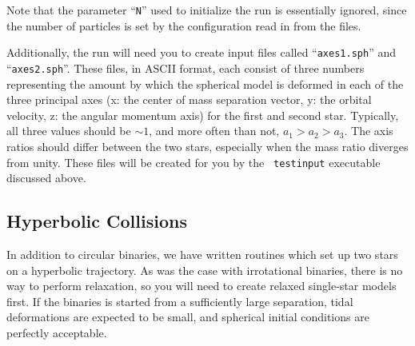 Note that the parameter ``{\tt N}'' used to initialize the run is
essentially ignored, since the number of particles is set by the
configuration read in from the files.

Additionally, the run will need you to create input files called
``{\tt axes1.sph}'' and ``{\tt axes2.sph}''.  These files, in ASCII
format, each consist of three
numbers representing the amount by which the spherical model is
deformed in each of the three principal axes (x: the center of mass
separation vector, y: the orbital velocity, z: the angular momentum
axis) for the first and second star.
Typically, all three values should be $\sim 1$, and more often than
not, $a_1>a_2>a_3$.  The axis ratios should differ between the two
stars, especially when the mass ratio diverges from unity.
These files will be created for you by the {\tt
testinput} executable discussed above.

\subsection{Hyperbolic Collisions}
\label{in:hy}
In addition to circular binaries, we have written routines which set
up two stars on a hyperbolic trajectory.  As was the case with
irrotational binaries, there is no way to perform relaxation, so you
will need to create relaxed single-star models first.  If the binaries
is started from a sufficiently large separation, tidal deformations
are expected to be small, and spherical initial conditions are
perfectly acceptable.

